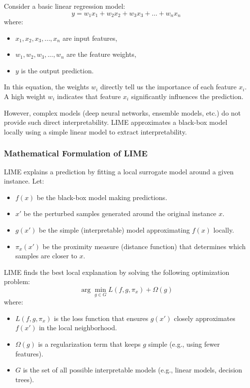 Consider a basic linear regression model:
\begin{equation}
    y = w_1x_1 + w_2x_2 + w_3x_3 + \dots + w_nx_n
\end{equation}
where:
\begin{itemize}
    \item \( x_1, x_2, x_3, ..., x_n \) are input features,
    \item \( w_1, w_2, w_3, ..., w_n \) are the feature weights,
    \item \( y \) is the output prediction.
\end{itemize}

In this equation, the weights \( w_i \) directly tell us the importance of each feature \( x_i \). A high weight \( w_i \) indicates that feature \( x_i \) significantly influences the prediction.

However, complex models (deep neural networks, ensemble models, etc.) do not provide such direct interpretability. LIME approximates a black-box model locally using a simple linear model to extract interpretability.

\subsubsection{Mathematical Formulation of LIME}
LIME explains a prediction by fitting a local surrogate model around a given instance. Let:
\begin{itemize}
    \item \( f(x) \) be the black-box model making predictions.
    \item \( x' \) be the perturbed samples generated around the original instance \( x \).
    \item \( g(x') \) be the simple (interpretable) model approximating \( f(x) \) locally.
    \item \( \pi_x(x') \) be the proximity measure (distance function) that determines which samples are closer to \( x \).
\end{itemize}

LIME finds the best local explanation by solving the following optimization problem:
\begin{equation}
    \arg \min_{g \in G} L(f, g, \pi_x) + \Omega(g)
\end{equation}
where:
\begin{itemize}
    \item \( L(f, g, \pi_x) \) is the loss function that ensures \( g(x') \) closely approximates \( f(x') \) in the local neighborhood.
    \item \( \Omega(g) \) is a regularization term that keeps \( g \) simple (e.g., using fewer features).
    \item \( G \) is the set of all possible interpretable models (e.g., linear models, decision trees).
\end{itemize}

